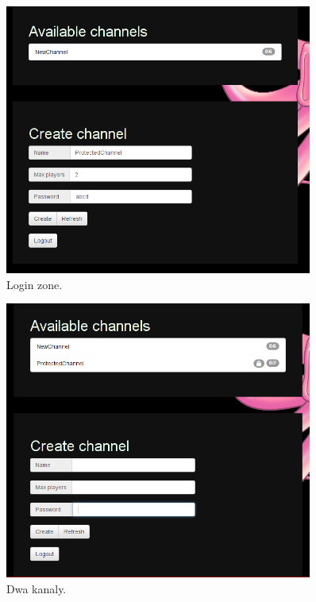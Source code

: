 \begin{figure}[ht]
    \centering
    \includegraphics[width=0.9\textwidth]{imgs/beforeCreation.png}
    \caption{Login zone.}
    \label{fig:zone}
\end{figure}

\begin{figure}[ht]
    \centering
    \includegraphics[width=0.9\textwidth]{imgs/twoChannels.png}
    \caption{Dwa kanaly.}
    \label{fig:chans}
\end{figure}

